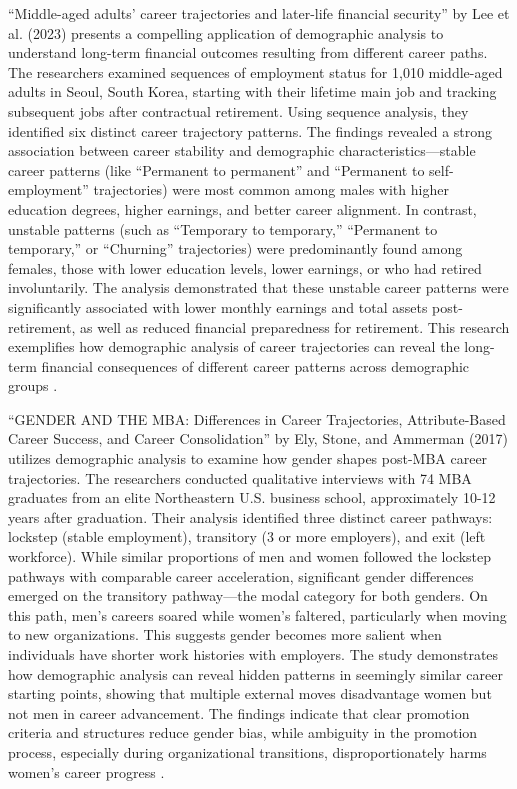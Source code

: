 \documentclass[../main.tex]{subfiles}
\begin{document}
 ``Middle-aged adults' career trajectories and later-life financial security'' by Lee et al. (2023) presents a compelling application of demographic analysis to understand long-term financial outcomes resulting from different career paths. The researchers examined sequences of employment status for 1,010 middle-aged adults in Seoul, South Korea, starting with their lifetime main job and tracking subsequent jobs after contractual retirement. Using sequence analysis, they identified six distinct career trajectory patterns. The findings revealed a strong association between career stability and demographic characteristics—stable career patterns (like ``Permanent to permanent'' and ``Permanent to self-employment'' trajectories) were most common among males with higher education degrees, higher earnings, and better career alignment. In contrast, unstable patterns (such as ``Temporary to temporary,'' ``Permanent to temporary,'' or ``Churning'' trajectories) were predominantly found among females, those with lower education levels, lower earnings, or who had retired involuntarily. The analysis demonstrated that these unstable career patterns were significantly associated with lower monthly earnings and total assets post-retirement, as well as reduced financial preparedness for retirement. This research exemplifies how demographic analysis of career trajectories can reveal the long-term financial consequences of different career patterns across demographic groups \citep{lee2023middle}.

 ``GENDER AND THE MBA: Differences in Career Trajectories, Attribute-Based Career Success, and Career Consolidation'' by Ely, Stone, and Ammerman (2017) utilizes demographic analysis to examine how gender shapes post-MBA career trajectories. The researchers conducted qualitative interviews with 74 MBA graduates from an elite Northeastern U.S. business school, approximately 10-12 years after graduation. Their analysis identified three distinct career pathways: lockstep (stable employment), transitory (3 or more employers), and exit (left workforce). While similar proportions of men and women followed the lockstep pathways with comparable career acceleration, significant gender differences emerged on the transitory pathway—the modal category for both genders. On this path, men's careers soared while women's faltered, particularly when moving to new organizations. This suggests gender becomes more salient when individuals have shorter work histories with employers. The study demonstrates how demographic analysis can reveal hidden patterns in seemingly similar career starting points, showing that multiple external moves disadvantage women but not men in career advancement. The findings indicate that clear promotion criteria and structures reduce gender bias, while ambiguity in the promotion process, especially during organizational transitions, disproportionately harms women's career progress \citep{ely2017gender}.
\end{document}

